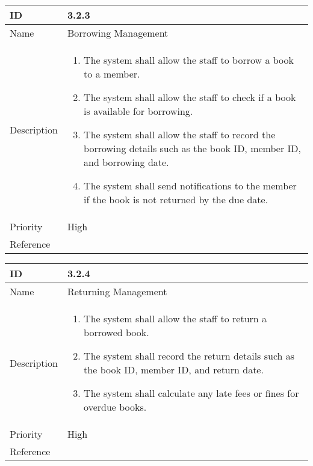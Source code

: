 \begin{center}
\begin{tabular}{ | m{5em} | m{6.5cm}|  } 
  \hline
  ID & 3.2.3\\ 
  \hline
  Name & Borrowing Management \\ 
  \hline
  Description & 
  \begin{enumerate}
  
      \item The system shall allow the staff to borrow a book to a member.
      \item The system shall allow the staff to check if a book is available for borrowing.
      \item The system shall allow the staff to record the borrowing details such as the book ID, member ID, and borrowing date.
      \item The system shall send notifications to the member if the book is not returned by the due date.

  \end{enumerate} \\
  \hline
  
  Priority & High \\
  \hline
  Reference & \\
  \hline
\end{tabular}
\end{center}

\begin{center}
\begin{tabular}{ | m{5em} | m{6.5cm}|  } 
  \hline
  ID & 3.2.4\\ 
  \hline
  Name & Returning Management \\ 
  \hline
  Description & 
  \begin{enumerate}
      \item The system shall allow the staff to return a borrowed book.
      \item The system shall record the return details such as the book ID, member ID, and return date.
      \item The system shall calculate any late fees or fines for overdue books.
  \end{enumerate} \\
  \hline
  
  Priority & High\\
  \hline
  Reference & \\
  \hline
\end{tabular}
\end{center}


